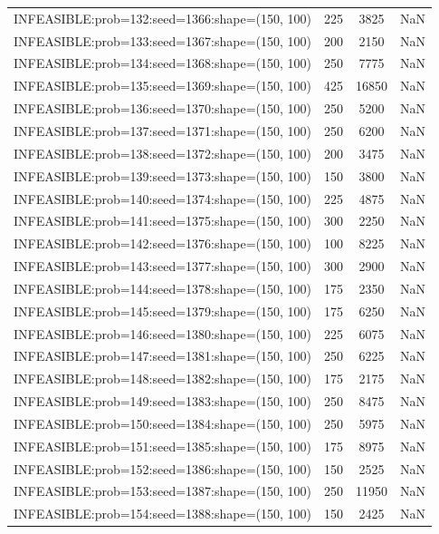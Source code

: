 \begin{longtable}{lccc}
INFEASIBLE:prob=132:seed=1366:shape=(150, 100) &      225 &  3825 &    NaN \\
INFEASIBLE:prob=133:seed=1367:shape=(150, 100) &      200 &  2150 &    NaN \\
INFEASIBLE:prob=134:seed=1368:shape=(150, 100) &      250 &  7775 &    NaN \\
INFEASIBLE:prob=135:seed=1369:shape=(150, 100) &      425 & 16850 &    NaN \\
INFEASIBLE:prob=136:seed=1370:shape=(150, 100) &      250 &  5200 &    NaN \\
INFEASIBLE:prob=137:seed=1371:shape=(150, 100) &      250 &  6200 &    NaN \\
INFEASIBLE:prob=138:seed=1372:shape=(150, 100) &      200 &  3475 &    NaN \\
INFEASIBLE:prob=139:seed=1373:shape=(150, 100) &      150 &  3800 &    NaN \\
INFEASIBLE:prob=140:seed=1374:shape=(150, 100) &      225 &  4875 &    NaN \\
INFEASIBLE:prob=141:seed=1375:shape=(150, 100) &      300 &  2250 &    NaN \\
INFEASIBLE:prob=142:seed=1376:shape=(150, 100) &      100 &  8225 &    NaN \\
INFEASIBLE:prob=143:seed=1377:shape=(150, 100) &      300 &  2900 &    NaN \\
INFEASIBLE:prob=144:seed=1378:shape=(150, 100) &      175 &  2350 &    NaN \\
INFEASIBLE:prob=145:seed=1379:shape=(150, 100) &      175 &  6250 &    NaN \\
INFEASIBLE:prob=146:seed=1380:shape=(150, 100) &      225 &  6075 &    NaN \\
INFEASIBLE:prob=147:seed=1381:shape=(150, 100) &      250 &  6225 &    NaN \\
INFEASIBLE:prob=148:seed=1382:shape=(150, 100) &      175 &  2175 &    NaN \\
INFEASIBLE:prob=149:seed=1383:shape=(150, 100) &      250 &  8475 &    NaN \\
INFEASIBLE:prob=150:seed=1384:shape=(150, 100) &      250 &  5975 &    NaN \\
INFEASIBLE:prob=151:seed=1385:shape=(150, 100) &      175 &  8975 &    NaN \\
INFEASIBLE:prob=152:seed=1386:shape=(150, 100) &      150 &  2525 &    NaN \\
INFEASIBLE:prob=153:seed=1387:shape=(150, 100) &      250 & 11950 &    NaN \\
INFEASIBLE:prob=154:seed=1388:shape=(150, 100) &      150 &  2425 &    NaN \\

\end{longtable}
